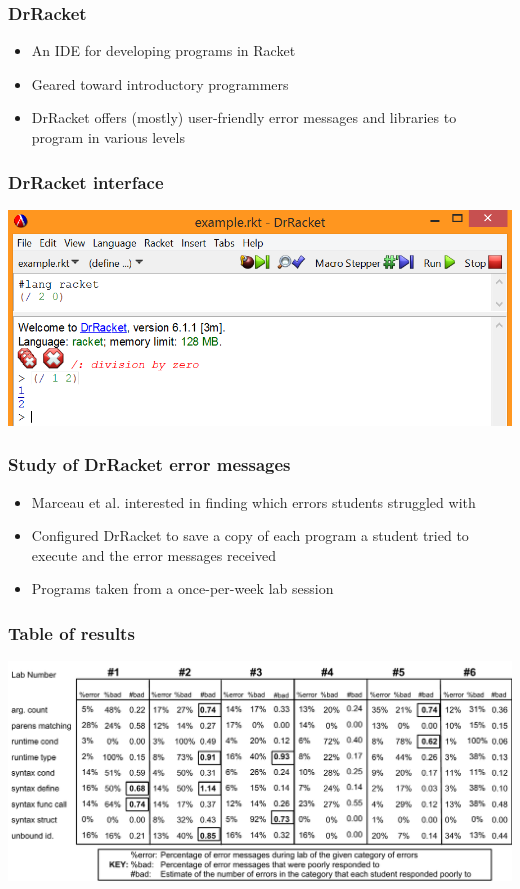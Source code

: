 \documentclass{beamer}
\begin{document}
\begin{frame}
	\frametitle{DrRacket}
		\begin{itemize}
			\item An IDE for developing programs in Racket
			\item Geared toward introductory programmers
			\item DrRacket offers (mostly) user-friendly error messages and libraries to program in various levels
		\end{itemize}
		
\end{frame}

\begin{frame}
	\frametitle{DrRacket interface}
			\includegraphics[keepaspectratio, width= 1.0 \textwidth]{drracketGUI.png}

\end{frame}

\begin{frame}
	\frametitle{Study of DrRacket error messages}
		\begin{itemize}
			\item Marceau et al. interested in finding which errors students struggled with
			\item Configured DrRacket to save a copy of each program a student tried to execute and the error messages received
			\item Programs taken from a once-per-week lab session
		\end{itemize} 

\end{frame}

\begin{frame}
	\frametitle{Table of results}
	\includegraphics[keepaspectratio, width=1.0 \textwidth]{MEE-data.pdf}

\end{frame}
\end{document}

